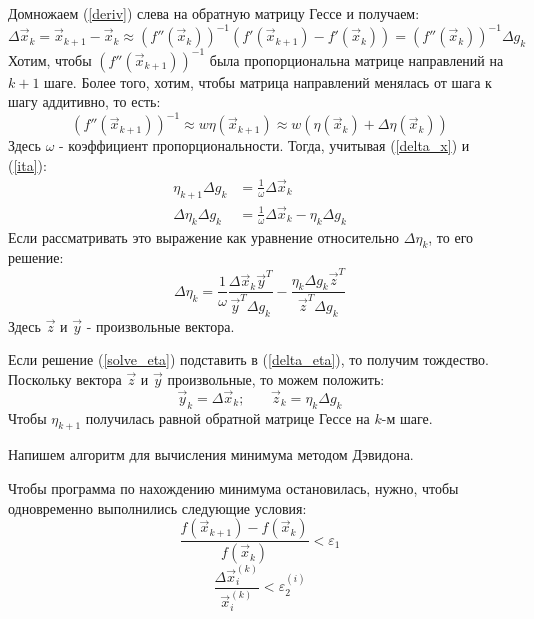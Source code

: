 Домножаем (\ref{deriv}) слева на обратную матрицу Гессе и получаем:
\begin{equation}
    \Delta \vec x_k=\vec x_{k+1}-\vec x_k \approx \left(f''(\vec x_k)\right)^{-1}\left(f'(\vec x_{k+1})-f'(\vec x_k)\right) =  \left(f''(\vec x_k)\right)^{-1}\Delta g_k
\label{delta_x}
\end{equation}
Хотим, чтобы $ \left(f''(\vec x_{k+1})\right)^{-1}$ была пропорциональна матрице направлений на $k+1$ шаге. Более того, хотим, чтобы матрица направлений менялась от шага к шагу аддитивно, то есть:
\begin{equation}
    (f''(\vec x_{k+1}))^{-1} \approx w\eta(\vec x_{k+1}) \approx w(\eta(\vec x_k)+\Delta \eta (\vec x_k))
    \label{ita}
\end{equation}
Здесь $\omega$ - коэффициент пропорциональности. Тогда, учитывая (\ref{delta_x}) и (\ref{ita}):
\begin{align}
    \eta_{k+1}\Delta g_k & {}= \frac1{\omega}\Delta \vec x_k \\
    \Delta \eta_{k} \Delta g_k & {} =
    \frac1{\omega} \Delta \vec x_k - \eta_k \Delta g_k
    \label{delta_eta}\end{align}
Если рассматривать это выражение как уравнение относительно $\Delta \eta_k$, то его решение:
\begin{equation}
    \Delta \eta_k = \frac1{\omega}\frac{\Delta\vec x_k {\vec y}^T}{{\vec y}^T \Delta g_k} - \frac{\eta_k \Delta g_k {\vec z}^T}{{\vec z}^T \Delta g_k}
    \label{solve_eta}
\end{equation}
Здесь $\vec z$ и $\vec y$ - произвольные вектора.

Если решение (\ref{solve_eta}) подставить в (\ref{delta_eta}), то получим тождество. Поскольку вектора $\vec z$ и $\vec y$ произвольные, то можем положить:
\begin{equation}
    \vec y_k = \Delta \vec x_k \text{;} \qquad \vec z_k = \eta_k \Delta g_k
\end{equation}
Чтобы $\eta_{k+1}$ получилась равной обратной матрице Гессе на $k$-м шаге.

Напишем алгоритм для вычисления минимума методом Дэвидона.

Чтобы программа по нахождению минимума остановилась, нужно, чтобы одновременно выполнились следующие условия:
\begin{equation}
    \frac{f(\vec x_{k+1}) - f(\vec x_k)}{f(\vec x_k)} < \varepsilon_1
\end{equation}
\begin{equation}
    \frac{\Delta \vec x_i^{(k)}}{\vec x_i^{(k)}} < \varepsilon_{2}^{(i)}
\end{equation}